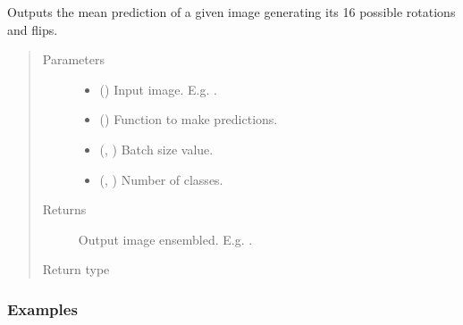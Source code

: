 \documentclass[letterpaper,10pt,english]{sphinxmanual}
\begin{document}
\begin{fulllineitems}
\label{\detokenize{data/post_processing/post_processing:data.post_processing.post_processing.ensemble16_3d_predictions}}
Outputs the mean prediction of a given image generating its 16 possible rotations and flips.
\begin{quote}\begin{description}
\item[{Parameters}] \leavevmode\begin{itemize}
\item {} 
 () \textendash{} Input image. E.g. .

\item {} 
 () \textendash{} Function to make predictions.

\item {} 
 (, ) \textendash{} Batch size value.

\item {} 
 (, ) \textendash{} Number of classes.

\end{itemize}

\item[{Returns}] \leavevmode
{} \textendash{} Output image ensembled. E.g. .

\item[{Return type}] \leavevmode
{}

\end{description}\end{quote}
\subsubsection*{Examples}


\end{fulllineitems}
\end{document}
